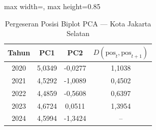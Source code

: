 \begin{table}[H]
\centering
\caption{Pergeseran Posisi Biplot PCA --- Kota Jakarta Selatan} \label{tab:appjarak_pca_skor_kota_jakarta_selatan}
\begin{adjustbox}{max width=\textwidth, max height=0.85\textheight}
\begin{tabular}{|c|c|c|c|}
\hline
\textbf{Tahun} & \textbf{PC1} & \textbf{PC2} & \textbf{$D(\text{pos}_t, \text{pos}_{t+1})$} \\
\hline
2020 & 5,0349 & -0,0277 & 1,1038 \\
2021 & 4,5292 & -1,0089 & 0,4502 \\
2022 & 4,4859 & -0,5608 & 0,6397 \\
2023 & 4,6724 & 0,0511 & 1,3954 \\
2024 & 4,5994 & -1,3424 & -- \\
\hline
\end{tabular}
\end{adjustbox}
\end{table}